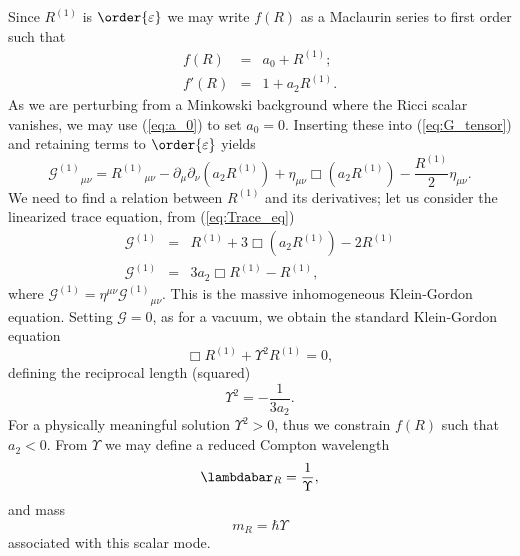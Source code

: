 \documentclass[aps,prd,reprint,showpacs]{revtex4-1}
\newcommand{\eqnref}[1]{(\ref{eq:#1})}
\newcommand{\recip}[1]{\ensuremath{\frac{1}{#1}}}
\begin{document}
Since $R^{(1)}$ is $\order{\varepsilon}$ we may write $f(R)$ as a Maclaurin series to first order such that
\begin{eqnarray}
f(R) & = & a_0 + R^{(1)};\\
f'(R) & = & 1 + a_2 R^{(1)}.
\end{eqnarray}
As we are perturbing from a Minkowski background where the Ricci scalar vanishes, we may use \eqnref{a_0} to set $a_0 = 0$. Inserting these into \eqnref{G_tensor} and retaining terms to $\order{\varepsilon}$ yields
\begin{equation}
{\mathcal{G}^{(1)}}_{\mu\nu} = {R^{(1)}}_{\mu\nu} - \partial_\mu\partial_\nu(a_2 R^{(1)}) + \eta_{\mu\nu}\Box(a_2 R^{(1)}) - \frac{R^{(1)}}{2}\eta_{\mu\nu}.
\label{eq:Field}
\end{equation}
We need to find a relation between $R^{(1)}$ and its derivatives; let us consider the linearized trace equation, from \eqnref{Trace_eq}
\begin{eqnarray}
\mathcal{G}^{(1)} & = & R^{(1)} + 3 \Box(a_2 R^{(1)}) - 2 R^{(1)} \nonumber \\
\mathcal{G}^{(1)} & = & 3a_2 \Box R^{(1)} - R^{(1)},
\label{eq:Box_R}
\end{eqnarray}
where $\mathcal{G}^{(1)} = \eta^{\mu\nu}{\mathcal{G}^{(1)}}_{\mu\nu}$. This is the massive inhomogeneous Klein-Gordon equation. Setting $\mathcal{G} = 0$, as for a vacuum, we obtain the standard Klein-Gordon equation
\begin{equation}
\Box R^{(1)} + \Upsilon^2 R^{(1)} = 0,
\end{equation}
defining the reciprocal length (squared)
\begin{equation}
\Upsilon^2 = -\recip{3a_2}.
\end{equation}
For a physically meaningful solution $\Upsilon^2 > 0$, thus we constrain $f(R)$ such that $a_2 < 0$\cite{Schmidt1986, Teyssandier1990, Olmo2005c, Corda2007}. From $\Upsilon$ we may define a reduced Compton wavelength
\begin{equation}
\lambdabar_R = \recip{\Upsilon},
\end{equation}
and mass
\begin{equation}
m_R = \hbar\Upsilon
\end{equation}
associated with this scalar mode.
\end{document}
